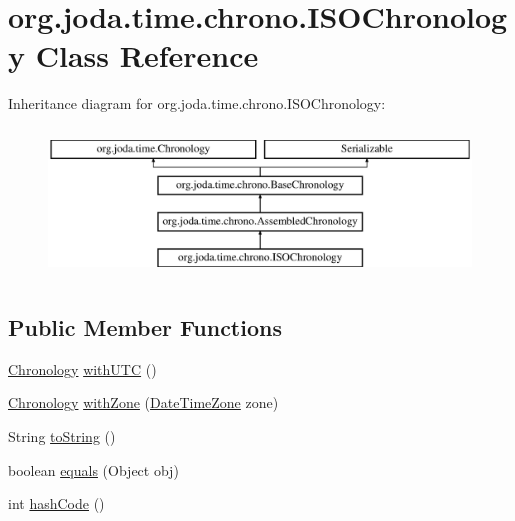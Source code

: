 \hypertarget{classorg_1_1joda_1_1time_1_1chrono_1_1_i_s_o_chronology}{\section{org.\-joda.\-time.\-chrono.\-I\-S\-O\-Chronology Class Reference}
\label{classorg_1_1joda_1_1time_1_1chrono_1_1_i_s_o_chronology}
}
Inheritance diagram for org.\-joda.\-time.\-chrono.\-I\-S\-O\-Chronology\-:\begin{figure}[H]
\begin{center}
\leavevmode
\includegraphics[height=4.000000cm]{classorg_1_1joda_1_1time_1_1chrono_1_1_i_s_o_chronology}
\end{center}
\end{figure}
\subsection*{Public Member Functions}
\begin{DoxyCompactItemize}
\item 
\hyperlink{classorg_1_1joda_1_1time_1_1_chronology}{Chronology} \hyperlink{classorg_1_1joda_1_1time_1_1chrono_1_1_i_s_o_chronology_a0688f24aa875e752c6140404d36c9423}{with\-U\-T\-C} ()
\item 
\hyperlink{classorg_1_1joda_1_1time_1_1_chronology}{Chronology} \hyperlink{classorg_1_1joda_1_1time_1_1chrono_1_1_i_s_o_chronology_a47a4189635c657fbe33b0ec721a83c4a}{with\-Zone} (\hyperlink{classorg_1_1joda_1_1time_1_1_date_time_zone}{Date\-Time\-Zone} zone)
\item 
String \hyperlink{classorg_1_1joda_1_1time_1_1chrono_1_1_i_s_o_chronology_af44ef80310410c102d58dafe23299a2a}{to\-String} ()
\item 
boolean \hyperlink{classorg_1_1joda_1_1time_1_1chrono_1_1_i_s_o_chronology_ac2678a4c56752f7fc356113f50184390}{equals} (Object obj)
\item 
int \hyperlink{classorg_1_1joda_1_1time_1_1chrono_1_1_i_s_o_chronology_abb2348eb4cf4bef875f8dc01162ce724}{hash\-Code} ()
\end{DoxyCompactItemize}
